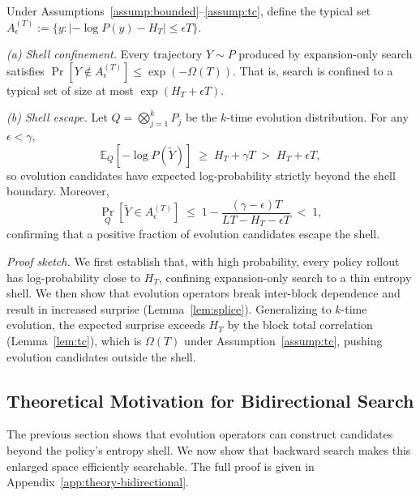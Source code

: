 \begin{theorem}
\label{thm:shell}
Under Assumptions~\ref{assump:bounded}--\ref{assump:tc}, define the typical set $A_\epsilon^{(T)}:=\{y:|-\log P(y)-H_T|\le\epsilon T\}$.

\textit{(a) Shell confinement.} Every trajectory $Y \sim P$ produced by expansion-only search satisfies $\Pr[Y \notin A_\epsilon^{(T)}] \leq \exp(-\Omega(T))$. That is, search is confined to a typical set of size at most $\exp(H_T + \epsilon T)$.

\textit{(b) Shell escape.} Let $Q = \bigotimes_{j=1}^k P_j$ be the $k$-time evolution distribution. For any $\epsilon < \gamma$,
\begin{equation}
  \mathbb{E}_Q[-\log P(\widetilde{Y})] \;\geq\; H_T + \gamma T \;>\; H_T + \epsilon T,
  \label{eq:escape-expectation}
\end{equation}
so evolution candidates have expected log-probability strictly beyond the shell boundary. Moreover,
\begin{equation}
  \Pr_Q\!\left[\widetilde{Y} \in A_\epsilon^{(T)}\right] \;\leq\; 1 - \frac{(\gamma - \epsilon)T}{LT - H_T - \epsilon T} \;<\; 1,
  \label{eq:escape-prob}
\end{equation}
confirming that a positive fraction of evolution candidates escape the shell.
\end{theorem}

\textit{Proof sketch.}
We first establish that, with high probability, every policy rollout has log-probability close to $H_T$, confining expansion-only search to a thin entropy shell. We then show that evolution operators break inter-block dependence and result in increased surprise (Lemma~\ref{lem:splice}). Generalizing to $k$-time evolution, the expected surprise exceeds $H_T$ by the block total correlation (Lemma~\ref{lem:tc}), which is $\Omega(T)$ under Assumption~\ref{assump:tc}, pushing evolution candidates outside the shell.

\subsection{Theoretical Motivation for Bidirectional Search}
\label{sec:theory-bidirectional}

The previous section shows that evolution operators can construct candidates beyond the policy's entropy shell. We now show that backward search makes this enlarged space efficiently searchable. The full proof is given in Appendix~\ref{app:theory-bidirectional}.

